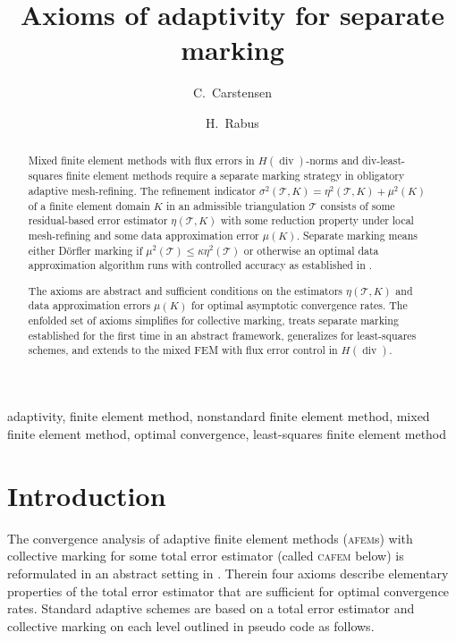 \documentclass{siamltex1213}
\title{Axioms of adaptivity for separate marking}
\author{C.~Carstensen\footnotemark[1] \footnotemark[2] \and H.~Rabus\footnotemark[1]}
\begin{document}
\maketitle

	

\pagestyle{myheadings}
\thispagestyle{plain}

\begin{abstract}
Mixed finite element methods with flux errors in $H(\operatorname{div})$-norms and div-least-squares 
finite element methods require a separate marking strategy in obligatory adaptive mesh-refining.
The refinement indicator $\sigma^2({\mathcal{T}},K)=\eta^2({\mathcal{T}},K)+\mu^2(K)$ of a finite 
element domain $K$ in an admissible triangulation ${\mathcal{T}}$ consists of some 
residual-based error estimator $\eta({\mathcal{T}},K)$ with some reduction property under local 
mesh-refining and some data approximation error $\mu(K)$. Separate marking means either D\"orfler
marking if $\mu^2({\mathcal{T}}) \leq \kappa \eta^2({\mathcal{T}})$ or otherwise an optimal data approximation algorithm runs with
controlled accuracy as established in \cite{CR09, safem2015}. 

The axioms are abstract and sufficient conditions on the estimators $\eta({\mathcal{T}},K)$ and data
approximation errors $\mu(K)$ for optimal asymptotic convergence rates. The enfolded set of axioms simplifies \cite{CFP14} for collective marking,
treats separate marking established for the first time in an abstract framework, generalizes \cite{CCP-lsfem}
for least-squares schemes, and extends \cite{CR09} to the mixed FEM with flux error control in $H(\operatorname{div})$.
\end{abstract}
\begin{keywords}
	adaptivity, finite element method, nonstandard finite element method,  
mixed finite element method, optimal convergence, 
least-squares finite element method
\end{keywords}

\section{Introduction}
The convergence analysis of adaptive finite element methods ({\textsc{afem}s\xspace}) with collective marking for some total error estimator (called {\textsc{cafem}\xspace} below) is reformulated in an abstract setting in \cite{CFP14}. Therein four axioms describe elementary properties of the total error estimator that are sufficient for optimal convergence rates. 
Standard adaptive schemes are based on a total error estimator and collective marking on each level outlined in pseudo code as follows. 
\medskip
\end{document}
